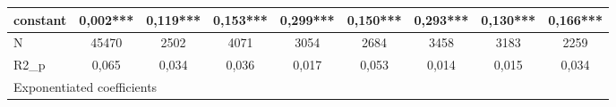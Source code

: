 {\begin{tabular}{l*{8}{c}}
constant    &       0,002***&       0,119***&       0,153***&       0,299***&       0,150***&       0,293***&       0,130***&       0,166***\\
\hline
N           &       45470   &        2502   &        4071   &        3054   &        2684   &        3458   &        3183   &        2259   \\
R2\_p        &       0,065   &       0,034   &       0,036   &       0,017   &       0,053   &       0,014   &       0,015   &       0,034   \\
\hline\hline
\multicolumn{9}{l}{\footnotesize Exponentiated coefficients}\\
\end{tabular}
}
